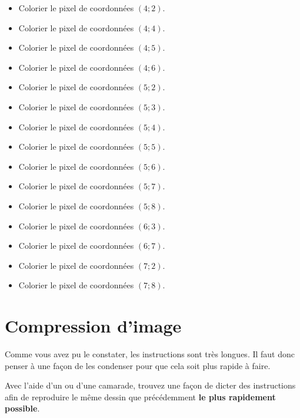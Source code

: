 \documentclass{exos}
\begin{document}
\begin{alphaquestions}
\begin{itemize}
\item Colorier le pixel de coordonnées $(4;2)$. 
\item Colorier le pixel de coordonnées $(4;4)$. 
\item Colorier le pixel de coordonnées $(4;5)$. 
\item Colorier le pixel de coordonnées $(4;6)$.
\item Colorier le pixel de coordonnées $(5;2)$.
\item Colorier le pixel de coordonnées $(5;3)$.
\item Colorier le pixel de coordonnées $(5;4)$.
\item Colorier le pixel de coordonnées $(5;5)$.
\item Colorier le pixel de coordonnées $(5;6)$.
\item Colorier le pixel de coordonnées $(5;7)$.
\item Colorier le pixel de coordonnées $(5;8)$.
\item Colorier le pixel de coordonnées $(6;3)$.
\item Colorier le pixel de coordonnées $(6;7)$.
\item Colorier le pixel de coordonnées $(7;2)$.
\item Colorier le pixel de coordonnées $(7;8)$.
\end{itemize}
\end{alphaquestions}

\section{Compression d'image}
Comme vous avez pu le constater, les instructions sont très longues. Il faut donc penser à une façon de les condenser pour que cela soit plus rapide à faire.

\begin{tcolorbox}
Avec l'aide d'un ou d'une camarade, trouvez une façon de dicter des instructions afin de reproduire le même dessin que précédemment \textbf{le plus rapidement possible}.
\end{tcolorbox}
\end{document}
